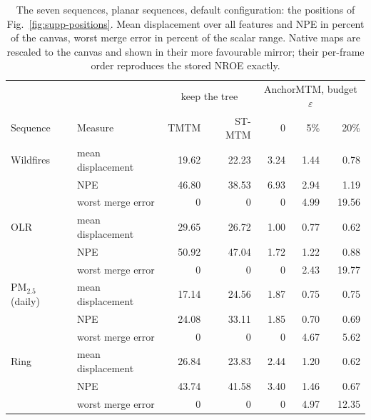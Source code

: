 \documentclass[preprint]{vgtc}   %
\begin{document}
\begin{table}[t]
\centering\small
\caption{The seven sequences, planar sequences, default configuration: the positions of Fig.~\ref{fig:supp-positions}. Mean displacement over all features and NPE in percent of the canvas, worst merge error in percent of the scalar range. Native maps are rescaled to the canvas and shown in their more favourable mirror; their per-frame order reproduces the stored NROE exactly.}\label{tab:full-planar-positions}
\setlength{\tabcolsep}{4.2pt}
\begin{tabular}{ll|rr|rrr}\toprule
 & & \multicolumn{2}{c|}{keep the tree} & \multicolumn{3}{c}{AnchorMTM, budget $\varepsilon$}\\
Sequence & Measure & TMTM & ST-MTM & 0 & 5\% & 20\%\\\midrule
Wildfires & mean displacement & 19.62 & 22.23 & 3.24 & 1.44 & 0.78\\
 & NPE & 46.80 & 38.53 & 6.93 & 2.94 & 1.19\\
 & worst merge error & 0 & 0 & 0 & 4.99 & 19.56\\
OLR & mean displacement & 29.65 & 26.72 & 1.00 & 0.77 & 0.62\\
 & NPE & 50.92 & 47.04 & 1.72 & 1.22 & 0.88\\
 & worst merge error & 0 & 0 & 0 & 2.43 & 19.77\\
PM$_{2.5}$ (daily) & mean displacement & 17.14 & 24.56 & 1.87 & 0.75 & 0.75\\
 & NPE & 24.08 & 33.11 & 1.85 & 0.70 & 0.69\\
 & worst merge error & 0 & 0 & 0 & 4.67 & 5.62\\
Ring & mean displacement & 26.84 & 23.83 & 2.44 & 1.20 & 0.62\\
 & NPE & 43.74 & 41.58 & 3.40 & 1.46 & 0.67\\
 & worst merge error & 0 & 0 & 0 & 4.97 & 12.35\\\bottomrule
\end{tabular}
\end{table}
\end{document}
